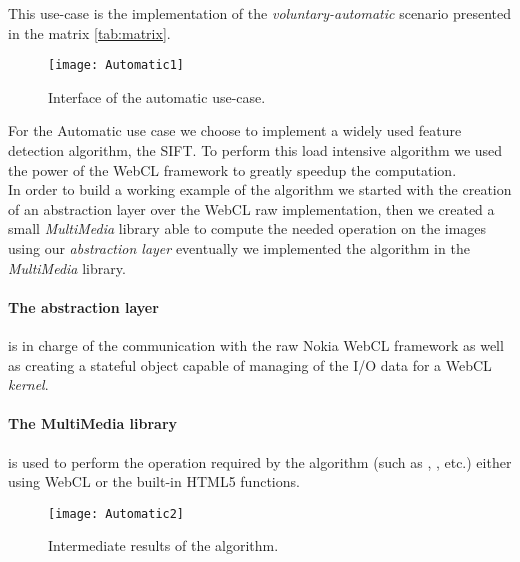 This use-case is the implementation of the \emph{voluntary-automatic} scenario
presented in the matrix \autoref{tab:matrix}.

\begin{figure}[htb]
    \centering
    \texttt{[image: Automatic1]}
    \caption{Interface of the automatic use-case.}
    \label{fig:Automatic1}
\end{figure}

For the Automatic use case we choose to implement a widely used feature detection
algorithm, the \ac{SIFT}. To perform this load intensive algorithm we used the
power of the \ac{WebCL} framework to greatly speedup the computation.\\

In order to build a working example of the algorithm we started with the creation
of an abstraction layer over the \ac{WebCL} raw implementation, then we created
a small \emph{MultiMedia} library able to compute the needed operation on the
images using our \emph{abstraction layer} eventually we implemented the algorithm
in the \emph{MultiMedia} library.

\paragraph{The abstraction layer} is in charge of the communication with the raw
Nokia WebCL framework as well as creating a stateful object capable of
managing of the I/O data for a WebCL \emph{kernel}.

\paragraph{The MultiMedia library} is used to perform the operation required by
the algorithm (such as , ,  etc.) either
using \ac{WebCL} or the built-in HTML5 functions.

\begin{figure}[htb]
    \centering
    \texttt{[image: Automatic2]}
    \caption{Intermediate results of the algorithm.}
    \label{fig:Automatic2}
\end{figure}

